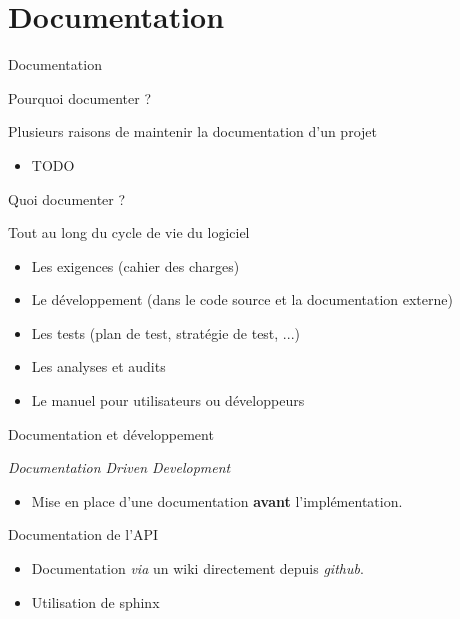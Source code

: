 \section{Documentation}

\begin{frame}{Documentation}  
\end{frame}

\begin{frame}{Pourquoi documenter ?}
  \begin{block}{Plusieurs raisons de maintenir la documentation d'un projet}
    \begin{itemize}
    \item TODO
    \end{itemize}
  \end{block}
\end{frame}

\begin{frame}{Quoi documenter ?}
  \begin{block}{Tout au long du cycle de vie du logiciel}
    \begin{itemize}
    \item Les exigences (cahier des charges)
    \item Le développement (dans le code source et la documentation externe)
    \item Les tests (plan de test, stratégie de test, ...)
    \item Les analyses et audits
    \item Le manuel pour utilisateurs ou développeurs
    \end{itemize}
  \end{block}
\end{frame}

\begin{frame}{Documentation et développement}
  \begin{block}{\textit{Documentation Driven Development}}
    \begin{itemize}
    \item Mise en place d'une documentation \textbf{avant} l'implémentation.
    \end{itemize}
  \end{block}

  
  \begin{block}{Documentation de l'API}
    \begin{itemize}
    \item Documentation \textit{via} un wiki directement depuis \textit{github}.
    \item Utilisation de \textsf{sphinx}
    \end{itemize}
  \end{block}  
\end{frame}

